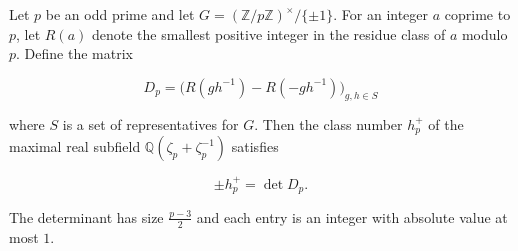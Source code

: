 Let $p$ be an odd prime and let $G = (\mathbb{Z}/p\mathbb{Z})^{\times}/\{\pm 1\}$. For an integer $a$ coprime to $p$, let $R(a)$ denote the smallest positive integer in the residue class of $a$ modulo $p$. Define the matrix

$$D_p = \bigl(R(gh^{-1}) - R(-gh^{-1})\bigr)_{g, h \in S}$$

where $S$ is a set of representatives for $G$. Then the class number $h_p^+$ of the maximal real subfield $\mathbb{Q}(\zeta_p + \zeta_p^{-1})$ satisfies

$$\pm h_p^+ = \det D_p.$$

The determinant has size $\frac{p-3}{2}$ and each entry is an integer with absolute value at most $1$.

